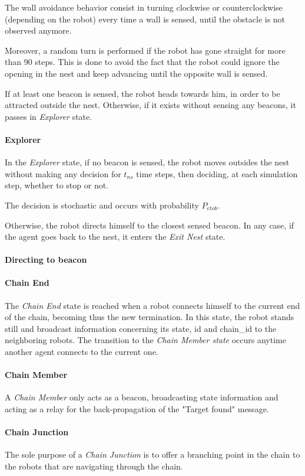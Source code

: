 The wall avoidance behavior consist in turning clockwise or counterclockwise (depending on the robot) every time a wall is sensed, until the obstacle is not observed anymore.

Moreover, a random turn is performed if the robot has gone straight for more than 90 steps.
This is done to avoid the fact that the robot could ignore the opening in the nest and keep advancing until the opposite wall is sensed.

If at least one beacon is sensed, the robot heads towards him, in order to be attracted outside the nest.
Otherwise, if it exists without sensing any beacons, it passes in \emph{Explorer} state.
\paragraph{Explorer}
In the \emph{Explorer} state, if no beacon is sensed, the robot moves outsides the nest without making any decision for $t_{ns}$ time steps, then deciding, at each simulation step, whether to stop or not.

The decision is stochastic and occurs with probability $P_{etob}$.

Otherwise, the robot directs himself to the closest sensed beacon.
In any case, if the agent goes back to the nest, it enters the \emph{Exit Nest} state.
\paragraph{Directing to beacon}

\paragraph{Chain End}
The \emph{Chain End} state is reached when a robot connects himself to the current end of the chain, becoming thus the new termination.
In this state, the robot stands still and broadcast information concerning its state, id and chain\_id to the neighboring robots.
The transition to the \emph{Chain Member state} occurs anytime another agent connects to the current one.

\paragraph{Chain Member}
A \emph{Chain Member} only acts as a beacon, broadcasting state information and acting as a relay for the back-propagation of the "Target found" message.

\paragraph{Chain Junction}
The sole purpose of a \emph{Chain Junction} is to offer a branching point in the chain to the robots that are navigating through the chain.
